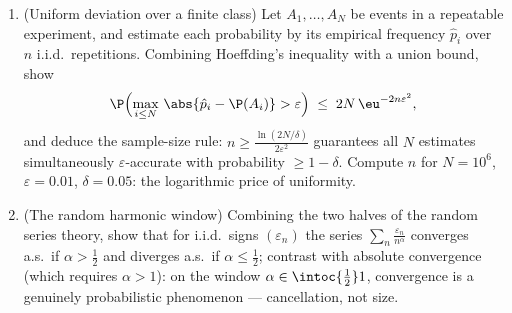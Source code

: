 \begin{problem}
\begin{enumerate}[resume]
  \item (Uniform deviation over a finite class) Let $A_1,
        \dots, A_N$ be events in a repeatable experiment,
        and estimate each probability by its empirical
        frequency $\hat p_i$ over $n$ i.i.d.\ repetitions.
        Combining Hoeffding's inequality with a union bound,
        show
        \[
        \P\Bigl(\max_{i\leq N}\,\abs{\hat p_i - \P(A_i)} >
        \varepsilon\Bigr) \;\leq\; 2N\,\eu^{-2n\varepsilon^2},
        \]
        and deduce the sample-size rule: $n \geq
        \frac{\ln(2N/\delta)}{2\varepsilon^2}$ guarantees
        all $N$ estimates simultaneously
        $\varepsilon$-accurate with probability $\geq 1 -
        \delta$. Compute $n$ for $N = 10^6$, $\varepsilon =
        0.01$, $\delta = 0.05$: the logarithmic price of
        uniformity.
  \item (The random harmonic window) Combining the two
        halves of the random series theory, show that for
        i.i.d.\ signs $(\varepsilon_n)$ the series
        $\sum_n\frac{\varepsilon_n}{n^\alpha}$ converges
        a.s.\ if $\alpha > \frac12$ and diverges a.s.\ if
        $\alpha \leq \frac12$; contrast with absolute
        convergence (which requires $\alpha > 1$): on the
        window $\alpha \in \intoc{\frac12}1$, convergence
        is a genuinely probabilistic phenomenon ---
        cancellation, not size.
\end{enumerate}
\end{problem}
